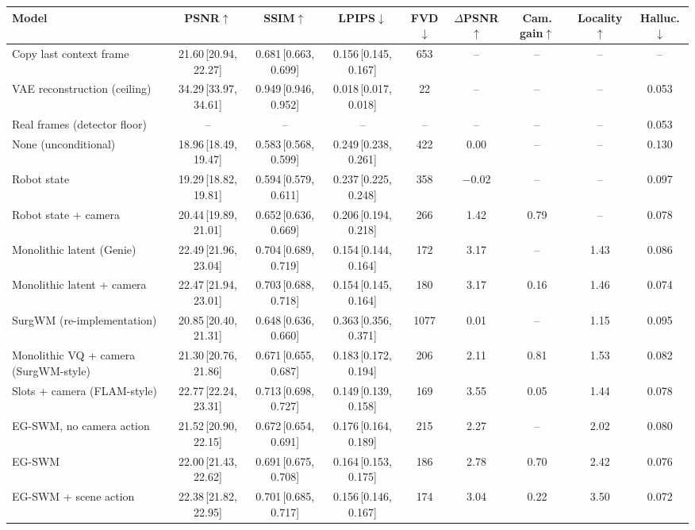\begin{tabular}{lcccccccc}
\toprule
Model & PSNR$\uparrow$ & SSIM$\uparrow$ & LPIPS$\downarrow$ & FVD$\downarrow$ & $\Delta$PSNR$\uparrow$ & Cam. gain$\uparrow$ & Locality$\uparrow$ & Halluc.$\downarrow$ \\
\midrule
Copy last context frame & 21.60\,{\scriptsize[20.94, 22.27]} & 0.681\,{\scriptsize[0.663, 0.699]} & 0.156\,{\scriptsize[0.145, 0.167]} & 653 & -- & -- & -- & -- \\
VAE reconstruction (ceiling) & 34.29\,{\scriptsize[33.97, 34.61]} & 0.949\,{\scriptsize[0.946, 0.952]} & 0.018\,{\scriptsize[0.017, 0.018]} & 22 & -- & -- & -- & 0.053 \\
Real frames (detector floor) & -- & -- & -- & -- & -- & -- & -- & 0.053 \\
None (unconditional) & 18.96\,{\scriptsize[18.49, 19.47]} & 0.583\,{\scriptsize[0.568, 0.599]} & 0.249\,{\scriptsize[0.238, 0.261]} & 422 & 0.00 & -- & -- & 0.130 \\
Robot state & 19.29\,{\scriptsize[18.82, 19.81]} & 0.594\,{\scriptsize[0.579, 0.611]} & 0.237\,{\scriptsize[0.225, 0.248]} & 358 & $-$0.02 & -- & -- & 0.097 \\
Robot state + camera & 20.44\,{\scriptsize[19.89, 21.01]} & 0.652\,{\scriptsize[0.636, 0.669]} & 0.206\,{\scriptsize[0.194, 0.218]} & 266 & 1.42 & 0.79 & -- & 0.078 \\
Monolithic latent (Genie) & 22.49\,{\scriptsize[21.96, 23.04]} & 0.704\,{\scriptsize[0.689, 0.719]} & 0.154\,{\scriptsize[0.144, 0.164]} & 172 & 3.17 & -- & 1.43 & 0.086 \\
Monolithic latent + camera & 22.47\,{\scriptsize[21.94, 23.01]} & 0.703\,{\scriptsize[0.688, 0.718]} & 0.154\,{\scriptsize[0.145, 0.164]} & 180 & 3.17 & 0.16 & 1.46 & 0.074 \\
SurgWM (re-implementation) & 20.85\,{\scriptsize[20.40, 21.31]} & 0.648\,{\scriptsize[0.636, 0.660]} & 0.363\,{\scriptsize[0.356, 0.371]} & 1077 & 0.01 & -- & 1.15 & 0.095 \\
Monolithic VQ + camera (SurgWM-style) & 21.30\,{\scriptsize[20.76, 21.86]} & 0.671\,{\scriptsize[0.655, 0.687]} & 0.183\,{\scriptsize[0.172, 0.194]} & 206 & 2.11 & 0.81 & 1.53 & 0.082 \\
Slots + camera (FLAM-style) & 22.77\,{\scriptsize[22.24, 23.31]} & 0.713\,{\scriptsize[0.698, 0.727]} & 0.149\,{\scriptsize[0.139, 0.158]} & 169 & 3.55 & 0.05 & 1.44 & 0.078 \\
EG-SWM, no camera action & 21.52\,{\scriptsize[20.90, 22.15]} & 0.672\,{\scriptsize[0.654, 0.691]} & 0.176\,{\scriptsize[0.164, 0.189]} & 215 & 2.27 & -- & 2.02 & 0.080 \\
EG-SWM & 22.00\,{\scriptsize[21.43, 22.62]} & 0.691\,{\scriptsize[0.675, 0.708]} & 0.164\,{\scriptsize[0.153, 0.175]} & 186 & 2.78 & 0.70 & 2.42 & 0.076 \\
EG-SWM + scene action & 22.38\,{\scriptsize[21.82, 22.95]} & 0.701\,{\scriptsize[0.685, 0.717]} & 0.156\,{\scriptsize[0.146, 0.167]} & 174 & 3.04 & 0.22 & 3.50 & 0.072 \\
\bottomrule
\end{tabular}
